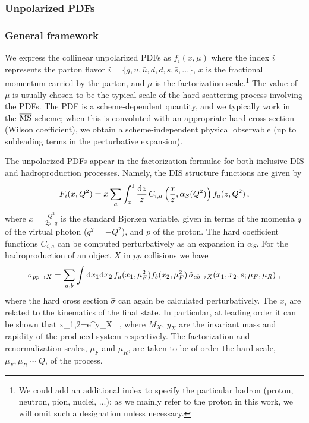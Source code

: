 \subsubsection{Unpolarized PDFs}

\subsubsection*{General framework}

We express the collinear unpolarized PDFs as $f_{i}(x,\mu)$
where the index $i$ represents the parton flavor $i=\{g,u,\bar{u},d,\bar{d},s,\bar{s},...\}$,
$x$ is the fractional momentum carried by the parton, and $\mu$
is the factorization  scale.\footnote{We could add an additional index to specify the particular hadron
(proton, neutron, pion, nuclei, ...); as we mainly refer to the proton
  in this work, we will omit such a designation unless necessary.}
%
The value of $\mu$ is usually chosen to be the typical scale of the hard scattering
process involving the PDFs.
%
The PDF is a scheme-dependent quantity, and we typically work in
the $\overline{\rm MS}$ scheme; when this is convoluted with an appropriate
hard cross section (Wilson coefficient), we obtain a scheme-independent
physical observable (up to subleading terms in the perturbative expansion). 


The unpolarized PDFs appear in the factorization formulae for both inclusive DIS and hadroproduction processes. Namely, the DIS structure functions are given by
\begin{equation}
F_i(x,Q^2)=x\sum_a \int_x^1 \frac{{\rm d}z}{z}\,C_{i,a}\left(\frac{x}{z},\alpha_S(Q^2)\right)f_a(z,Q^2)\, ,
\end{equation}
where $x=\frac{Q^2}{2p\cdot q}$ is the standard Bjorken variable, given in terms of the momenta $q$ of the virtual photon ($q^2=-Q^2$), and $p$ of the proton. 
%
The hard coefficient functions $C_{i,a}$ can be computed perturbatively as an expansion in $\alpha_S$.
%
For the hadroproduction of an object $X$ in $pp$ collisions we have
\begin{equation}
  \label{eq:LHCxsec}
\sigma_{pp\to X}=\sum_{a,b}\int {\rm d}x_1 {\rm d}x_2\, f_a(x_1,\mu_F^2)f_b(x_2,\mu_F^2)\,\hat{\sigma}_{ab\to X}(x_1,x_2,s;\mu_{F},\mu_R)\;,
\end{equation}
where the hard cross section $\hat{\sigma}$ can again be calculated perturbatively. The $x_i$ are related to the kinematics of the final state.
%
In particular, at leading order it can be shown that
\be
x_{1,2}=e^{\pm y_X} \, ,
\ee
where $M_X$, $y_X$ are the invariant mass and rapidity of the produced system respectively.
%
The factorization and renormalization scales, $\mu_F$ and $\mu_R$, are taken to be of order the hard scale, $\mu_F,\mu_R
\sim Q$, of the process.

